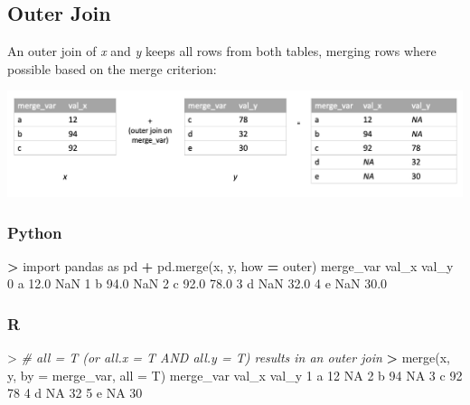 \documentclass[
]{book}
\newenvironment{Shaded}{\begin{snugshade}}{\end{snugshade}}
\newcommand{\AttributeTok}[1]{\textcolor[rgb]{0.77,0.63,0.00}{#1}}
\newcommand{\CommentTok}[1]{\textcolor[rgb]{0.56,0.35,0.01}{\textit{#1}}}
\newcommand{\ConstantTok}[1]{\textcolor[rgb]{0.00,0.00,0.00}{#1}}
\newcommand{\DecValTok}[1]{\textcolor[rgb]{0.00,0.00,0.81}{#1}}
\newcommand{\ErrorTok}[1]{\textcolor[rgb]{0.64,0.00,0.00}{\textbf{#1}}}
\newcommand{\FloatTok}[1]{\textcolor[rgb]{0.00,0.00,0.81}{#1}}
\newcommand{\FunctionTok}[1]{\textcolor[rgb]{0.00,0.00,0.00}{#1}}
\newcommand{\ImportTok}[1]{#1}
\newcommand{\NormalTok}[1]{#1}
\newcommand{\OperatorTok}[1]{\textcolor[rgb]{0.81,0.36,0.00}{\textbf{#1}}}
\newcommand{\SpecialCharTok}[1]{\textcolor[rgb]{0.00,0.00,0.00}{#1}}
\newcommand{\StringTok}[1]{\textcolor[rgb]{0.31,0.60,0.02}{#1}}
\begin{document}
\hypertarget{outer-join}{%
\subsection{Outer Join}\label{outer-join}}

An outer join of \emph{x} and \emph{y} keeps all rows from both tables, merging rows where possible based on the merge criterion:

\includegraphics[width=17.25in]{images/outer_join}

\hypertarget{python-30}{%
\subsubsection*{Python}\label{python-30}}

\begin{Shaded}
\begin{Highlighting}[]
\OperatorTok{\textgreater{}} \ImportTok{import}\NormalTok{ pandas }\ImportTok{as}\NormalTok{ pd}
\OperatorTok{+}\NormalTok{ pd.merge(x, y, how }\OperatorTok{=} \StringTok{\textquotesingle{}outer\textquotesingle{}}\NormalTok{)}
\NormalTok{  merge\_var  val\_x  val\_y}
\DecValTok{0}\NormalTok{         a   }\FloatTok{12.0}\NormalTok{    NaN}
\DecValTok{1}\NormalTok{         b   }\FloatTok{94.0}\NormalTok{    NaN}
\DecValTok{2}\NormalTok{         c   }\FloatTok{92.0}   \FloatTok{78.0}
\DecValTok{3}\NormalTok{         d    NaN   }\FloatTok{32.0}
\DecValTok{4}\NormalTok{         e    NaN   }\FloatTok{30.0}
\end{Highlighting}
\end{Shaded}

\hypertarget{r-30}{%
\subsubsection*{R}\label{r-30}}

\begin{Shaded}
\begin{Highlighting}[]
\SpecialCharTok{\textgreater{}} \CommentTok{\# all = T (or all.x = T AND all.y = T) results in an outer join}
\ErrorTok{\textgreater{}} \FunctionTok{merge}\NormalTok{(x, y, }\AttributeTok{by =} \StringTok{\textquotesingle{}merge\_var\textquotesingle{}}\NormalTok{, }\AttributeTok{all =}\NormalTok{ T)}
\NormalTok{  merge\_var val\_x val\_y}
\DecValTok{1}\NormalTok{         a    }\DecValTok{12}    \ConstantTok{NA}
\DecValTok{2}\NormalTok{         b    }\DecValTok{94}    \ConstantTok{NA}
\DecValTok{3}\NormalTok{         c    }\DecValTok{92}    \DecValTok{78}
\DecValTok{4}\NormalTok{         d    }\ConstantTok{NA}    \DecValTok{32}
\DecValTok{5}\NormalTok{         e    }\ConstantTok{NA}    \DecValTok{30}
\end{Highlighting}
\end{Shaded}
\end{document}
